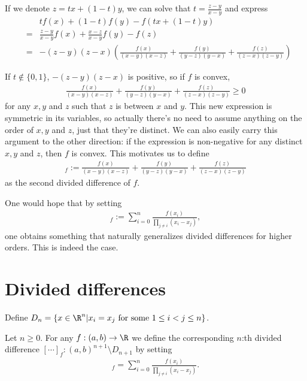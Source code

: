 If we denote $z = t x + (1 - t) y$, we can solve that $t = \frac{z - y}{x - y}$ and express
\begin{eqnarray*}
	&& t f(x) + (1 - t) f(y) - f(t x + (1 - t)y) \\
	&=& \frac{z - y}{x - y} f(x) + \frac{x - z}{x - y} f(y) - f(z) \\
	&=& -(z - y)(z - x) \left(\frac{f(x)}{(x - y)(x - z)} + \frac{f(y)}{(y - z)(y - x)} + \frac{f(z)}{(z - x)(z - y)} \right)
\end{eqnarray*}

If $t \notin \{0, 1\}$, $-(z - y)(z - x)$ is positive, so if $f$ is convex,
\begin{align*}
	\frac{f(x)}{(x - y)(x - z)} + \frac{f(y)}{(y - z)(y - x)} + \frac{f(z)}{(z - x)(z - y)} \geq 0
\end{align*}
for any $x, y$ and $z$ such that $z$ is between $x$ and $y$. This new expression is symmetric in its variables, so actually there's no need to assume anything on the order of $x, y$ and $z$, just that they're distinct. We can also easily carry this argument to the other direction: if the expression is non-negative for any distinct $x, y$ and $z$, then $f$ is convex. This motivates us to define
\begin{align*}
	[x, y, z]_{f} := \frac{f(x)}{(x - y)(x - z)} + \frac{f(y)}{(y - z)(y - x)} + \frac{f(z)}{(z - x)(z - y)}
\end{align*}
as the second divided difference of $f$.

One would hope that by setting
\begin{align*}
	[x_{0}, x_{1}, \ldots, x_{n}]_{f} := \sum_{i = 0}^{n} \frac{f(x_{i})}{\prod_{j \neq i} (x_{i} - x_{j})},
\end{align*}
one obtains something that naturally generalizes divided differences for higher orders. This is indeed the case.

\section{Divided differences}

Define $D_{n} = \{x\in \R^{n} | x_{i} = x_{j} \text{ for some $1 \leq i < j \leq n$}\}$.
\begin{maar}
Let $n \geq 0$. For any $f : (a, b) \to \R$ we define the corresponding $n$:th divided difference $[\cdots]_{f} : (a, b)^{n + 1} \setminus D_{n + 1}$ by setting
\begin{align*}
	[x_{0}, x_{1}, \ldots, x_{n}]_{f} = \sum_{i = 0}^{n} \frac{f(x_{i})}{\prod_{j \neq i} (x_{i} - x_{j})}.
\end{align*}
\end{maar}

